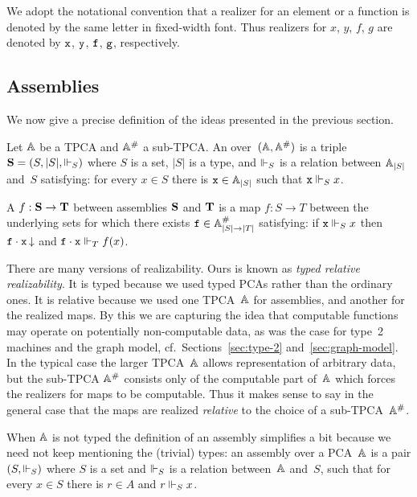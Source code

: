 We adopt the notational convention that a realizer for an element or a
function is denoted by the same letter in fixed-width font. Thus
realizers for $x$, $y$, $f$, $g$ are denoted by $\R{x}$, $\R{y}$,
$\R{f}$, $\R{g}$, respectively.

\subsection{Assemblies}
\label{sec:assemblies}

We now give a precise definition of the ideas presented in the
previous section.

\begin{definition}[Assemblies]
  Let $\AA$ be a TPCA and $\compAA$ a sub-TPCA. An 
  over~$(\AA, \compAA)$ is a triple $\asm{S} = \xasm{S}$ where $S$ is
  a set, $|S|$ is a type, and $\rz_S$ is a relation between
  $\xAtyp{S}$ and~$S$ satisfying: for every $x \in S$ there is $\R{x}
  \in \xAtyp{S}$ such that $\R{x} \rz_S x$.

  A  $f : \asm{S} \to \asm{T}$ between assemblies
  $\asm{S}$ and $\asm{T}$ is a map $f : S \to T$ between the
  underlying sets for which there exists $\R{f} \in \compAtyp{|S| \to
    |T|}$ satisfying: if $\R{x} \rz_S x$ then $\defined{\R{f} \cdot
    \R{x}}$ and $\R{f} \cdot \R{x} \rz_T f(x)$.
\end{definition}

There are many versions of realizability. Ours is known as \emph{typed
  relative realizability}. It is typed because we used typed PCAs
rather than the ordinary ones. It is relative because we used one
TPCA~$\AA$ for assemblies, and another for the realized maps. By this we
are capturing the idea that computable functions may operate on
potentially non-computable data, as was the case for type~2 machines
and the graph model, cf.\ Sections~\ref{sec:type-2}
and~\ref{sec:graph-model}. In the typical case the larger TPCA~$\AA$
allows representation of arbitrary data, but the sub-TPCA $\compAA$
consists only of the computable part of~$\AA$ which forces the realizers
for maps to be computable. Thus it makes sense to say in the general
case that the maps are realized \emph{relative} to the choice of a
sub-TPCA~$\compAA$.

When $\AA$ is not typed the definition of an assembly simplifies a bit
because we need not keep mentioning the (trivial) types: an assembly
over a PCA~$\AA$ is a pair $(S, {\rz_S})$ where $S$ is a set and $\rz_S$
is a relation between~$\AA$ and~$S$, such that for every $x \in S$ there
is $r \in A$ and $r \rz_S x$.

